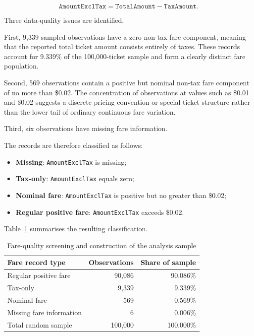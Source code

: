 \documentclass[11pt,a4paper]{article}
\begin{document}
\[
\texttt{AmountExclTax} = \texttt{TotalAmount} - \texttt{TaxAmount}.
\]

Three data-quality issues are identified.

First, 9,339 sampled observations have a zero non-tax fare component, meaning that the reported total ticket amount consists entirely of taxes. These records account for 9.339\% of the 100,000-ticket sample and form a clearly distinct fare population.

Second, 569 observations contain a positive but nominal non-tax fare component of no more than \$0.02. The concentration of observations at values such as \$0.01 and \$0.02 suggests a discrete pricing convention or special ticket structure rather than the lower tail of ordinary continuous fare variation.

Third, six observations have missing fare information.

The records are therefore classified as follows:

\begin{itemize}
    \item \textbf{Missing}: \texttt{AmountExclTax} is missing;
    \item \textbf{Tax-only}: \texttt{AmountExclTax} equals zero;
    \item \textbf{Nominal fare}: \texttt{AmountExclTax} is positive but no greater than \$0.02;
    \item \textbf{Regular positive fare}: \texttt{AmountExclTax} exceeds \$0.02.
\end{itemize}

Table~\ref{tab:sample-construction} summarises the resulting classification.

\begin{table}[H]
\centering
\caption{Fare-quality screening and construction of the analysis sample}
\label{tab:sample-construction}
\begin{tabular}{lrr}
\toprule
\textbf{Fare record type} & \textbf{Observations} & \textbf{Share of sample} \\
\midrule
Regular positive fare & 90,086 & 90.086\% \\
Tax-only & 9,339 & 9.339\% \\
Nominal fare & 569 & 0.569\% \\
Missing fare information & 6 & 0.006\% \\
\midrule
Total random sample & 100,000 & 100.000\% \\
\bottomrule
\end{tabular}
\end{table}
\end{document}
